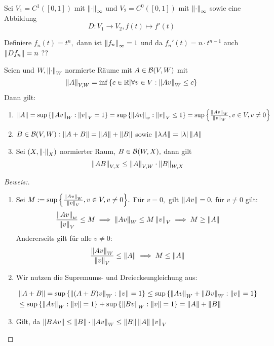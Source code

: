 \begin{ex} \label{Differential_op}
    Sei $V_1 = C^1([0, 1])$ mit $\norms{\cdot}$ und $V_2 = C^0([0, 1])$ mit $\norms{\cdot}$ sowie eine Abbildung \[D: V_1 \to V_2, f(t) \mapsto f'(t)\]
    
    Definiere $f_n(t) = t^n,$ dann ist $\norms{f_n} = 1$ und da $f_n'(t) = n \cdot t^{n-1}$ auch $\norm{Df_n} = n$
    ??
\end{ex}

\begin{theorem}
    Seien und $W, \norm{\cdot}_W$ normierte Räume mit $ A \in \B(V, W)$ mit \[\norm{A}_{V,W} = \inf{\set{c \in \mathbb{R}| \forall v \in V: \norm{Av}_{W} \leq c}}\] Dann gilt:
    \begin{enumerate}
        \item $\norm{A} = \sup{\set{\norm{Av}_W: \norm{v}_V = 1}} = \sup{\set{\norm{Av}_w: \norm{v}_V \leq 1}} = \sup{\set{\frac{\norm{Av}_W}{\norm{v}_W}, v \in V, v \not=0}}$
        \item $B \in \B(V, W): \norm{A +B} = \norm{A}+\norm{B}$ sowie $\norm{\lambda A} = \ab{\lambda}\norm{A}$
        \item Sei $(X, \norm{\cdot}_X)$ normierter Raum, $B \in \B(W, X),$ dann gilt 
        \[\norm{AB}_{V,X} \leq \norm{A}_{V,W}\cdot\norm{B}_{W,X}\]
    \end{enumerate}
    
    \begin{proof}[Beweis:]
    \begin{enumerate}
        \item Sei $M := \sup{\set{\frac{\norm{Av}_W}{\norm{v}_V}, v\in V, v \not= 0}}.$ Für $v = 0,$ gilt $\norm{Av} = 0,$ für $v \not=0$ gilt:
        \[\frac{\norm{Av}_w}{\norm{v}_V} \leq M \implies \norm{Av}_W \leq M \norm{v}_V \implies M \geq \norm{A}\]
        Andererseits gilt für alle $v \not= 0:$
        \[\frac{\norm{Av}_W}{\norm{v}_V} \leq \norm{A} \implies M \leq \norm A\]
        \item Wir nutzen die Supremums- und Dreiecksungleichung aus:
        
        \begin{align*}
        & \norm{A+B} = \sup{\set{\norm{(A+B)v}_W: \norm{v} = 1}} \leq \sup{\set{\norm{Av}_W+\norm{Bv}_W: \norm{v} = 1}} \\
        & \leq \sup{\set{\norm{Av}_W: \norm{v} = 1}} + \sup{\set{\norm{Bv}_W: \norm{v} = 1}} = \norm{A}+ \norm{B}
        \end{align*}
        \item Gilt, da $\norm{BAv} \leq \norm{B}\cdot \norm{Av}_W \leq \norm{B} \norm{A} \norm{v}_V$
        
    \end{enumerate}
    \end{proof}
\end{theorem}

